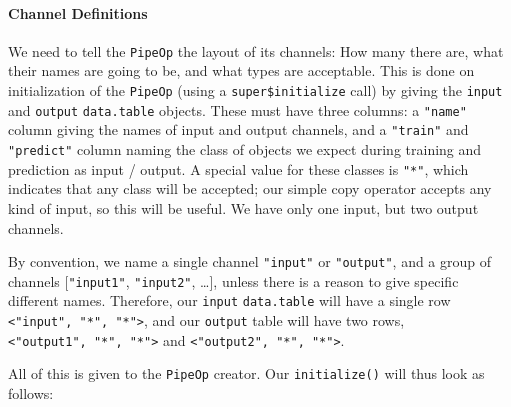 \documentclass[]{article}
\newenvironment{Shaded}{\begin{snugshade}}{\end{snugshade}}
\newcommand{\CommentTok}[1]{\textcolor[rgb]{0.56,0.35,0.01}{\textit{#1}}}
\newcommand{\ControlFlowTok}[1]{\textcolor[rgb]{0.13,0.29,0.53}{\textbf{#1}}}
\newcommand{\DataTypeTok}[1]{\textcolor[rgb]{0.13,0.29,0.53}{#1}}
\newcommand{\KeywordTok}[1]{\textcolor[rgb]{0.13,0.29,0.53}{\textbf{#1}}}
\newcommand{\NormalTok}[1]{#1}
\newcommand{\OperatorTok}[1]{\textcolor[rgb]{0.81,0.36,0.00}{\textbf{#1}}}
\newcommand{\StringTok}[1]{\textcolor[rgb]{0.31,0.60,0.02}{#1}}
\let\oldparagraph\paragraph
\renewcommand{\paragraph}[1]{\oldparagraph{#1}\mbox{}}
\renewenvironment{Shaded} {\begin{snugshade}\small} {\end{snugshade}}
\begin{document}
\hypertarget{channel-definitions}{%
\paragraph{Channel Definitions}\label{channel-definitions}}

We need to tell the \texttt{PipeOp} the layout of its channels: How many there are, what their names are going to be, and what types are acceptable.
This is done on initialization of the \texttt{PipeOp} (using a \texttt{super\$initialize} call) by giving the \texttt{input} and \texttt{output} \texttt{data.table} objects.
These must have three columns: a \texttt{"name"} column giving the names of input and output channels, and a \texttt{"train"} and \texttt{"predict"} column naming the class of objects we expect during training and prediction as input / output.
A special value for these classes is \texttt{"*"}, which indicates that any class will be accepted; our simple copy operator accepts any kind of input, so this will be useful. We have only one input, but two output channels.

By convention, we name a single channel \texttt{"input"} or \texttt{"output"}, and a group of channels {[}\texttt{"input1"}, \texttt{"input2"}, \ldots{}{]}, unless there is a reason to give specific different names. Therefore, our \texttt{input} \texttt{data.table} will have a single row \texttt{\textless{}"input",\ "*",\ "*"\textgreater{}}, and our \texttt{output} table will have two rows, \texttt{\textless{}"output1",\ "*",\ "*"\textgreater{}} and \texttt{\textless{}"output2",\ "*",\ "*"\textgreater{}}.

All of this is given to the \texttt{PipeOp} creator. Our \texttt{initialize()} will thus look as follows:

\begin{Shaded}
\end{Shaded}
\end{document}
